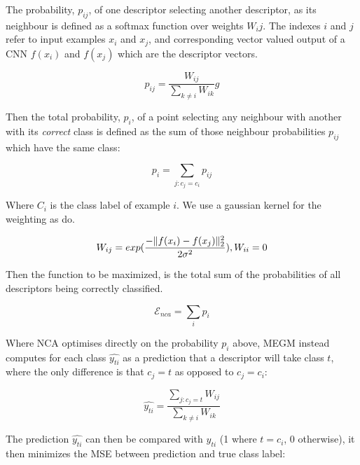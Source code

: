 The probability, $ p_{ij} $, of one descriptor selecting another descriptor, as its neighbour is defined as a softmax function over weights $W_ij$. The indexes $ i $ and $ j $ refer to input examples $x_i$ and $x_j$, and corresponding vector valued output of a \gls{CNN} $f(x_i)$ and $f(x_j)$ which are the descriptor vectors.

\begin{equation}
\label{eq:nca_prob_pair}
p_{ij} =  \frac {W_{ij}} {\sum_{k \neq i}{W_{ik}}}g
\end{equation}

Then the total probability, $ p_i $, of a point selecting any neighbour with another with its \emph{correct} class is defined as the sum of those neighbour probabilities $p_{ij}$ which have the same class:

\begin{equation}
\label{eq:nca_prob}
p_{i} =  \sum_{j:c_j = c_i}{p_{ij}}
\end{equation}

Where $ C_i $ is the class label of example $ i $. We use a gaussian kernel for the weighting as \cite{Zaidi2011} do. 

\begin{equation}
 \label{eq:gaussian_kernel}
W_{ij} = exp(\frac{-\lVert f(x_i) - f(x_j) \rVert^2_2 }{2\sigma^2}), \space W_{ii} = 0
\end{equation}


Then the function to be maximized, is the total sum of the probabilities of all descriptors being correctly classified.

\begin{equation}
\label{eq:nca_loss}
\mathcal{E}_{nca} =  \sum_i {p_i}
\end{equation}

Where \gls{NCA} optimises directly on the probability $ p_{i} $ above, \gls{MEGM} instead computes for each class $ \hat{y_{ti}} $ as a prediction that a descriptor will take class $ t $, where the only difference is that $ c_j = t $ as opposed to $ c_j = c_i $:

\begin{equation}
\label{eq:megm_pred}
\hat{y_{ti}} = \frac{\sum_{j:c_j = t}W_{ij}}{\sum_{k \neq i}{W_{ik}}}
\end{equation}

The prediction $ \hat{y_{ti}} $ can then be compared with $ y_{ti} $ (1 where $ t = c_i $, 0 otherwise), it then minimizes the \gls{MSE} between prediction and true class label:

